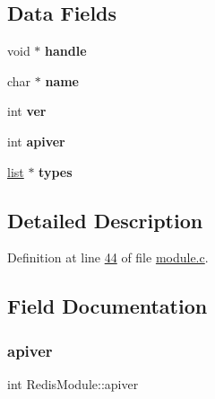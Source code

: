\subsection*{Data Fields}
\begin{DoxyCompactItemize}
\item 
\mbox{\label{structRedisModule_a9c26377a53062ac55b4fe2883b0be9f5}} 
void $\ast$ {\bfseries handle}
\item 
\mbox{\label{structRedisModule_aef4e327d81c55974ee3dc2d797bdcf94}} 
char $\ast$ {\bfseries name}
\item 
\mbox{\label{structRedisModule_a27bdecef862ee93e4d9c2eee7f180394}} 
int {\bfseries ver}
\item 
\mbox{\label{structRedisModule_a68e7323df886be0c5da311691db76ff4}} 
int {\bfseries apiver}
\item 
\mbox{\label{structRedisModule_a0301e92adcc1aa97a600a8a03d1ad555}} 
\hyperlink{structlist}{list} $\ast$ {\bfseries types}
\end{DoxyCompactItemize}


\subsection{Detailed Description}


Definition at line \hyperlink{module_8c_source_l00044}{44} of file \hyperlink{module_8c_source}{module.\+c}.



\subsection{Field Documentation}
\mbox{\label{structRedisModule_a68e7323df886be0c5da311691db76ff4}} 
\subsubsection{\texorpdfstring{apiver}{apiver}}
{\footnotesize\ttfamily int Redis\+Module\+::apiver}



